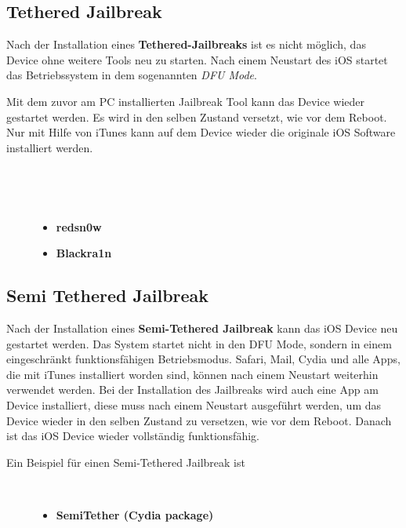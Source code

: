 \subsection{Tethered Jailbreak}
\label{sec:JBTethered}
Nach der Installation eines \textbf{Tethered-Jailbreaks} ist es nicht möglich, das Device ohne weitere Tools neu zu starten. Nach einem Neustart des iOS startet das Betriebssystem in dem sogenannten \textit{\glqq DFU Mode\grqq{}}. \par
Mit dem zuvor am PC installierten Jailbreak Tool kann das Device wieder gestartet werden. Es wird in den selben Zustand versetzt, wie vor dem Reboot. Nur mit Hilfe von iTunes kann auf dem Device wieder die originale iOS Software installiert werden. 
\begin{description}
     \item[\parbox{\textwidth} {Nachfolgend werden zwei häufig verwendete Tethered-Jailbreak Tools angeführt}]~\par
    \item[]~\par
	\begin{itemize}
            \item \textbf{redsn0w}
            \item \textbf{Blackra1n}
    \end{itemize}
\end{description} 

\subsection{Semi Tethered Jailbreak}
\label{sec:JBSemiTethered}

Nach der Installation eines \textbf{Semi-Tethered Jailbreak} kann das iOS Device neu gestartet werden. Das System startet nicht in den DFU Mode, sondern in einem eingeschränkt funktionsfähigen Betriebsmodus. Safari, Mail, Cydia und alle Apps, die mit iTunes installiert worden sind, können nach einem Neustart weiterhin verwendet werden. Bei der Installation des Jailbreaks wird auch eine App am Device installiert, diese muss nach einem Neustart ausgeführt werden, um das Device wieder in den selben Zustand zu versetzen, wie vor dem Reboot. Danach ist das iOS Device wieder vollständig funktionsfähig.

\begin{description}
    \item[Ein Beispiel für einen Semi-Tethered Jailbreak ist]~\par
	\begin{itemize}
        \item \textbf{SemiTether (Cydia package)}
    \end{itemize}
\end{description} 

